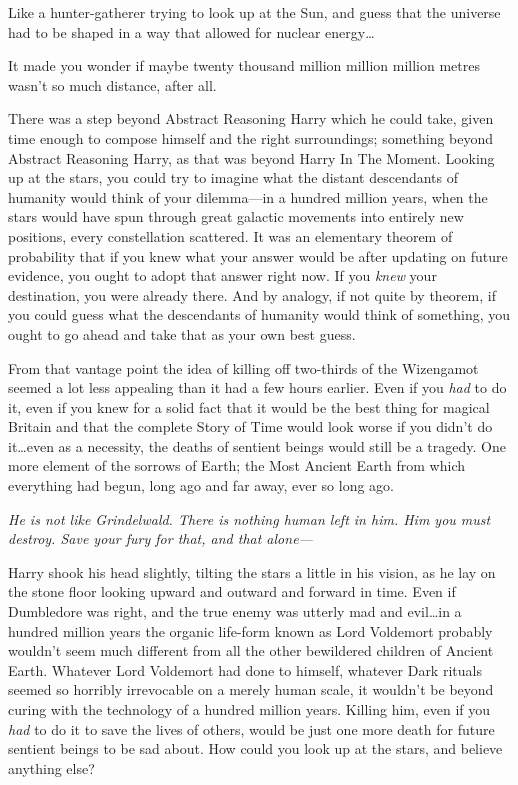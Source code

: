 Like a hunter-gatherer trying to look up at the Sun, and guess that the universe had to be shaped in a way that allowed for nuclear energy…

It made you wonder if maybe twenty thousand million million million metres wasn’t so much distance, after all.

There was a step beyond Abstract Reasoning Harry which he could take, given time enough to compose himself and the right surroundings; something beyond Abstract Reasoning Harry, as that was beyond Harry In The Moment. Looking up at the stars, you could try to imagine what the distant descendants of humanity would think of your dilemma—in a hundred million years, when the stars would have spun through great galactic movements into entirely new positions, every constellation scattered. It was an elementary theorem of probability that if you knew what your answer would be after updating on future evidence, you ought to adopt that answer right now. If you \emph{knew} your destination, you were already there. And by analogy, if not quite by theorem, if you could guess what the descendants of humanity would think of something, you ought to go ahead and take that as your own best guess.

From that vantage point the idea of killing off two-thirds of the Wizengamot seemed a lot less appealing than it had a few hours earlier. Even if you \emph{had} to do it, even if you knew for a solid fact that it would be the best thing for magical Britain and that the complete Story of Time would look worse if you didn’t do it…even as a necessity, the deaths of sentient beings would still be a tragedy. One more element of the sorrows of Earth; the Most Ancient Earth from which everything had begun, long ago and far away, ever so long ago.

\emph{He is not like Grindelwald. There is nothing human left in him. Him you must destroy. Save your fury for that, and that alone—}

Harry shook his head slightly, tilting the stars a little in his vision, as he lay on the stone floor looking upward and outward and forward in time. Even if Dumbledore was right, and the true enemy was utterly mad and evil…in a hundred million years the organic life-form known as Lord Voldemort probably wouldn’t seem much different from all the other bewildered children of Ancient Earth. Whatever Lord Voldemort had done to himself, whatever Dark rituals seemed so horribly irrevocable on a merely human scale, it wouldn’t be beyond curing with the technology of a hundred million years. Killing him, even if you \emph{had} to do it to save the lives of others, would be just one more death for future sentient beings to be sad about. How could you look up at the stars, and believe anything else?


